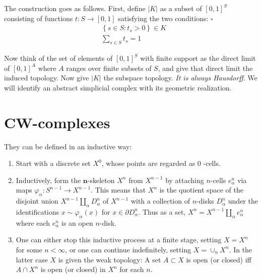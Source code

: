 The construction goes as follows. First, define $|K|$ as a subset of $[0,1]^S$ consisting of functions $t: S \rightarrow[0,1]$ satisfying the two conditions: $\square$
$$
\begin{aligned}
& \left\{s \in S: t_s>0\right\} \in K \\
& \sum_{s \in S} t_s=1
\end{aligned}
$$

Now think of the set of elements of $[0,1]^S$ with finite support as the direct limit of $[0,1]^A$ where $A$ ranges over finite subsets of $S$, and give that direct limit the induced topology. Now give $|K|$ the subspace topology. \textit{It is always Hausdorff}. We will identify an abstract simplicial complex with its geometric realization.









\section{CW-complexes}

They can be defined in an inductive way:

\begin{enumerate}
    \item Start with a discrete set $X^0$, whose points are regarded as 0 -cells.
    \item Inductively, form the $\boldsymbol{n}$-skeleton $X^n$ from $X^{n-1}$ by attaching $n$-cells $e_\alpha^n$ via maps $\varphi_\alpha: S^{n-1} \rightarrow X^{n-1}$. This means that $X^n$ is the quotient space of the disjoint union $X^{n-1} \amalg_\alpha D_\alpha^n$ of $X^{n-1}$ with a collection of $n$-disks $D_\alpha^n$ under the identifications $x \sim \varphi_\alpha(x)$ for $x \in \partial D_\alpha^n$. Thus as a set, $X^n=X^{n-1} \amalg_\alpha e_\alpha^n$ where each $e_\alpha^n$ is an open $n$-disk.
    \item One can either stop this inductive process at a finite stage, setting $X=X^n$ for some $n<\infty$, or one can continue indefinitely, setting $X=\cup_n X^n$. In the latter case $X$ is given the weak topology: A set $A \subset X$ is open (or closed) iff $A \cap X^n$ is open (or closed) in $X^n$ for each $n$.
    
\end{enumerate}

